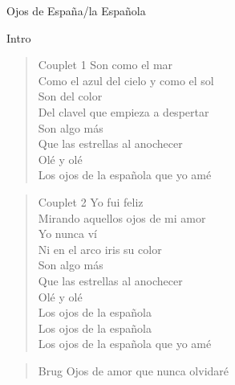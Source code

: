 \begin{song}[tango]{Ojos de España/la Española}
\begin{instrumental}{Intro}
\measure{}
\end{instrumental}

\begin{verse}{Couplet 1}
Son como el mar \\
Como el azul del cielo y como el sol \\
\chord{}Son del color \\
Del clavel que empieza a despertar \\
\chord{}Son algo más \\
Que las estrellas al anochecer \\
Olé y olé  \\
Los ojos de la española que yo amé \\
\end{verse}

\repetition{[Intro]}

\begin{verse}{Couplet 2}
Yo fui feliz \\
Mirando aquellos ojos de mi amor \\
\chord{}Yo nunca ví \\
Ni en el arco iris su color \\
\chord{}Son algo más \\
Que las estrellas al anochecer \\
Olé y olé  \\
Los ojos de la española \\
Los ojos de la española \\
Los ojos de la española que yo amé \\

\end{verse}
\begin{verse}{Brug}
Ojos de amor que nunca olvidaré
\end{verse}


\end{song}


\clearpage
\begin{translation}

\end{translation}
